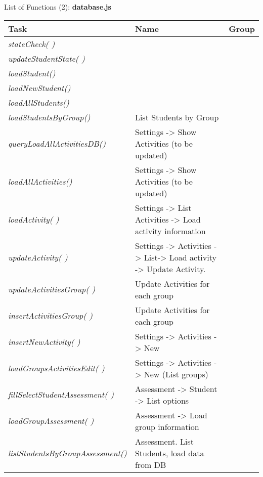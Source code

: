 \newpage


\begin{bclogo}[couleur=blue!30,arrondi=0.1, logo=\bcpanchant, barre=zigzag,  ombre=true ] 
{List of Functions (2): {\bf database.js}}	
\begin{tabular}{lll}
Task                    & Name            & Group \\
\hline



\emph { stateCheck( )}                  &{ }\\
\emph { updateStudentState( )}          &{ } \\
\emph { loadStudent()      }             &{ } \\
\emph { loadNewStudent()   }             & { } \\
\emph { loadAllStudents()  }             & { }\\
\emph { loadStudentsByGroup()}          & { List Students by Group } \\
\emph { queryLoadAllActivitiesDB()}     & { Settings -> Show Activities (to be updated) } \\
\emph { loadAllActivities() }           &{ Settings -> Show Activities (to be updated) } \\
\emph { loadActivity( )}                & {Settings -> List Activities -> Load activity information } \\
\emph { updateActivity(  )}             &{Settings -> Activities -> List-> Load activity -> Update Activity. }\\
\emph { updateActivitiesGroup( )}       &{ Update Activities for each group }\\
\emph { insertActivitiesGroup( )}       & { Update Activities for each group } \\
\emph {  insertNewActivity(  ) }        & {Settings -> Activities -> New }\\
\emph { loadGroupsActivitiesEdit( )}    & {Settings -> Activities -> New (List groups) } \\
\emph { fillSelectStudentAssessment( )}  & { Assessment -> Student -> List options  }\\
\emph { loadGroupAssessment(  ) }       & { Assessment -> Load group information } \\
\emph { listStudentsByGroupAssessment()} & {  Assessment. List Students, load data  from DB } \\

\end{tabular}
\end{bclogo}

